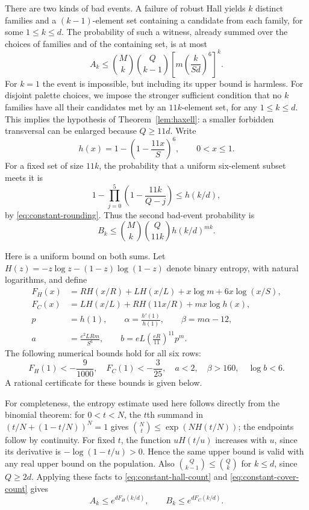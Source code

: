 \documentclass[11pt]{article}
\theoremstyle{definition}
\theoremstyle{remark}
\begin{document}
There are two kinds of bad events.  A failure of robust Hall yields $k$
distinct families and a $(k-1)$-element set containing a candidate from
each family, for some $1\le k\le d$.  The probability of such a witness,
already summed over the choices of families and of the containing set,
is at most
\begin{equation}\label{eq:constant-hall-count}
 A_k\le \binom{M}{k}\binom{Q}{k-1}
       \left[m\left(\frac{k}{Sd}\right)^6\right]^k.
\end{equation}
For $k=1$ the event is impossible, but including its upper bound is harmless.
For disjoint palette choices, we impose the stronger sufficient condition
that no $k$ families have all their candidates met by an $11k$-element
set, for any $1\le k\le d$.  This implies the hypothesis of
Theorem~\ref{lem:haxell}: a smaller forbidden transversal can be enlarged
because $Q\ge11d$.  Write
\[
 h(x)=1-\left(1-\frac{11x}{S}\right)^6,\qquad 0<x\le1.
\]
For a fixed set of size $11k$, the probability that a uniform six-element
subset meets it is
\[
 1-\prod_{j=0}^5\left(1-\frac{11k}{Q-j}\right)
 \le h(k/d),
\]
by \eqref{eq:constant-rounding}.  Thus the second bad-event probability is
\begin{equation}\label{eq:constant-cover-count}
 B_k\le\binom{M}{k}\binom{Q}{11k}h(k/d)^{mk}.
\end{equation}

Here is a uniform bound on both sums.  Let
$H(z)=-z\log z-(1-z)\log(1-z)$ denote binary entropy, with natural
logarithms, and define
\begin{align*}
 F_H(x)&=R H(x/R)+L H(x/L)+x\log m+6x\log(x/S),\\
 F_C(x)&=L H(x/L)+R H(11x/R)+mx\log h(x),\\
 p&=h(1),\qquad
 \alpha=\frac{h'(1)}{h(1)},\qquad
 \beta=m\alpha-12,\\
 a&=\frac{e^2 LRm}{S^6},\qquad
 b=eL\left(\frac{eR}{11}\right)^{11}p^m.
\end{align*}
The following numerical bounds hold for all six rows:
\begin{equation}\label{eq:constant-margins}
 F_H(1)<-\frac9{1000},\quad F_C(1)<-\frac3{25},\quad
 a<2,\quad \beta>160,\quad \log b<6.
\end{equation}
A rational certificate for these bounds is given below.

For completeness, the entropy estimate used here follows directly from
the binomial theorem: for $0<t<N$, the $t$th summand in
$(t/N+(1-t/N))^N=1$ gives
$\binom Nt\le\exp(NH(t/N))$; the endpoints follow by continuity.
For fixed $t$, the function $uH(t/u)$ increases with $u$, since its
 derivative is $-\log(1-t/u)>0$.  Hence the same upper bound is valid with
any real upper bound on the population.  Also
$\binom Q{k-1}\le\binom Qk$ for $k\le d$, since $Q\ge2d$.
Applying these facts to \eqref{eq:constant-hall-count} and
\eqref{eq:constant-cover-count} gives
\begin{equation}\label{eq:constant-entropy-bounds}
 A_k\le e^{dF_H(k/d)},\qquad B_k\le e^{dF_C(k/d)}.
\end{equation}
\end{document}

